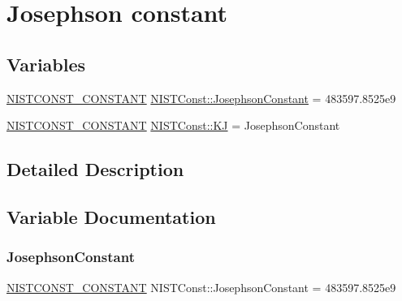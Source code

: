 \hypertarget{group___n_i_s_t_const-_josephson_constant}{}\section{Josephson constant}
\label{group___n_i_s_t_const-_josephson_constant}
\subsection*{Variables}
\begin{DoxyCompactItemize}
\item 
\mbox{\hyperlink{group___n_i_s_t_const-_macros_ga2b0fc1d7452373f816175dd86ce26729}{N\+I\+S\+T\+C\+O\+N\+S\+T\+\_\+\+C\+O\+N\+S\+T\+A\+NT}} \mbox{\hyperlink{group___n_i_s_t_const-_josephson_constant_gacafbc0c823771554a6ae27245b48d134}{N\+I\+S\+T\+Const\+::\+Josephson\+Constant}} = 483597.\+8525e9
\item 
\mbox{\hyperlink{group___n_i_s_t_const-_macros_ga2b0fc1d7452373f816175dd86ce26729}{N\+I\+S\+T\+C\+O\+N\+S\+T\+\_\+\+C\+O\+N\+S\+T\+A\+NT}} \mbox{\hyperlink{group___n_i_s_t_const-_josephson_constant_ga85a1a57d5412a21aee60d4e7196c3fc8}{N\+I\+S\+T\+Const\+::\+KJ}} = Josephson\+Constant
\end{DoxyCompactItemize}


\subsection{Detailed Description}


\subsection{Variable Documentation}
\mbox{\label{group___n_i_s_t_const-_josephson_constant_gacafbc0c823771554a6ae27245b48d134}} 
\subsubsection{\texorpdfstring{Josephson\+Constant}{JosephsonConstant}}
{\footnotesize\ttfamily \mbox{\hyperlink{group___n_i_s_t_const-_macros_ga2b0fc1d7452373f816175dd86ce26729}{N\+I\+S\+T\+C\+O\+N\+S\+T\+\_\+\+C\+O\+N\+S\+T\+A\+NT}} N\+I\+S\+T\+Const\+::\+Josephson\+Constant = 483597.\+8525e9}

